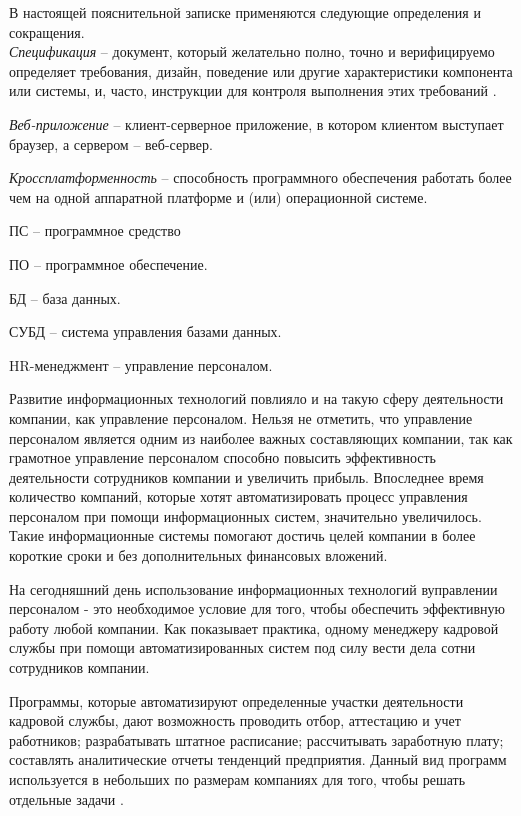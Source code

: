 \label{sec:definitions}

В настоящей пояснительной записке применяются следующие определения и сокращения.
\\

\emph{Спецификация} -- документ, который желательно полно, точно и верифицируемо определяет требования, дизайн,
поведение или другие характеристики компонента или системы, и, часто, инструкции для контроля выполнения этих
требований \cite{istqb_specification}.

\emph{Веб-приложение} -- клиент-серверное приложение, в котором клиентом выступает браузер, а сервером – веб-сервер.

\emph{Кроссплатформенность} -- способность программного обеспечения работать более чем на одной аппаратной платформе и (или) операционной системе.

ПС -- программное средство

ПО -- программное обеспечение.

БД -- база данных.

СУБД -- система управления базами данных.

HR-менеджмент -- управление персоналом.
\\

\label{sec:introduction}
 
Развитие информационных технологий повлияло и на такую сферу деятельности компании, как управление персоналом.
Нельзя не отметить, что управление персоналом является одним из наиболее важных составляющих компании, так как
грамотное управление персоналом способно повысить эффективность деятельности сотрудников компании и увеличить
прибыль. Впоследнее время количество компаний, которые хотят автоматизировать процесс управления персоналом при помощи
информационных систем, значительно увеличилось. Такие информационные системы помогают достичь целей компании в более
короткие сроки и без дополнительных финансовых вложений.

На сегодняшний день использование информационных технологий вуправлении персоналом - это необходимое условие для
того, чтобы обеспечить эффективную работу любой компании. Как показывает практика, одному менеджеру кадровой службы
при помощи автоматизированных систем под силу вести дела сотни сотрудников компании.

Программы, которые автоматизируют определенные участки деятельности кадровой службы, дают возможность проводить
отбор, аттестацию и учет работников; разрабатывать штатное расписание; рассчитывать заработную плату; составлять
аналитические отчеты тенденций предприятия. Данный вид программ используется в небольших по размерам компаниях
для того, чтобы решать отдельные задачи \cite{cyberleninka}.

